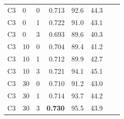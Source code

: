 \documentclass[pdflatex,sn-mathphys-num]{sn-jnl}%
\theoremstyle{thmstyleone}%
\theoremstyle{thmstyletwo}%
\theoremstyle{thmstylethree}%
\begin{document}
\begin{appendices}
\begin{table}[htbp]
\begin{tabular}{llrrrrrr}
\addlinespace[4pt]
C3 & 0 & 0 & 0.713 & 92.6 & 44.3 \\
C3 & 0 & 1 & 0.722 & 91.0 & 43.1 \\
C3 & 0 & 3 & 0.693 & 89.6 & 40.3 \\
C3 & 10 & 0 & 0.704 & 89.4 & 41.2 \\
C3 & 10 & 1 & 0.712 & 89.9 & 42.7 \\
C3 & 10 & 3 & 0.721 & 94.1 & 45.1 \\
C3 & 30 & 0 & 0.710 & 91.2 & 43.0 \\
C3 & 30 & 1 & 0.714 & 93.7 & 44.2 \\
C3 & 30 & 3 & \textbf{0.730} & 95.5 & 43.9 \\
\bottomrule
\end{tabular}
\end{table}


\end{appendices}
\end{document}

